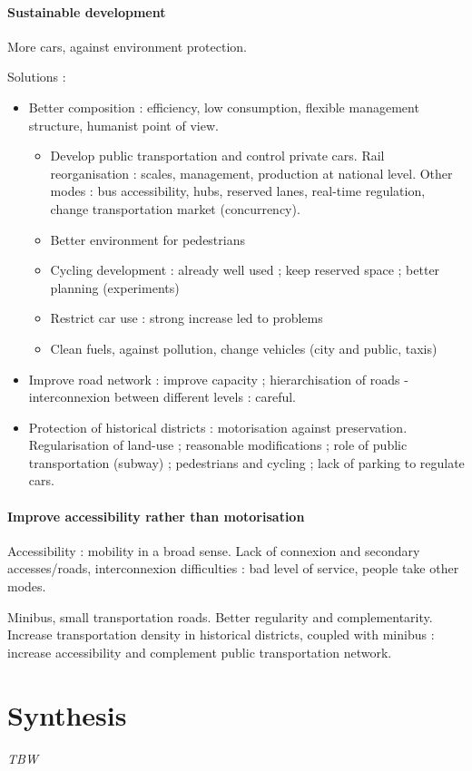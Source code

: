 \paragraph{Sustainable development}

More cars, against environment protection. 

Solutions : 
\begin{itemize}
\item Better composition : efficiency, low consumption, flexible management structure, humanist point of view.
\begin{itemize}
\item Develop public transportation and control private cars. Rail reorganisation : scales, management, production at national level. Other modes : bus accessibility, hubs, reserved lanes, real-time regulation, change transportation market (concurrency).
\item Better environment for pedestrians
\item Cycling development : already well used ; keep reserved space ; better planning (experiments)
\item Restrict car use : strong increase led to problems
\item Clean fuels, against pollution, change vehicles (city and public, taxis)
\end{itemize}
\item Improve road network : improve capacity ; hierarchisation of roads - interconnexion between different levels : careful.
\item Protection of historical districts : motorisation against preservation. Regularisation of land-use ; reasonable modifications ; role of public transportation (subway) ; pedestrians and cycling ; lack of parking to regulate cars.
\end{itemize}

\paragraph{Improve accessibility rather than motorisation}

Accessibility : mobility in a broad sense. Lack of connexion and secondary accesses/roads, interconnexion difficulties : bad level of service, people take other modes.

Minibus, small transportation roads. Better regularity and complementarity. Increase transportation density in historical districts, coupled with minibus : increase accessibility and complement public transportation network.





\section{Synthesis}

\textit{TBW}








